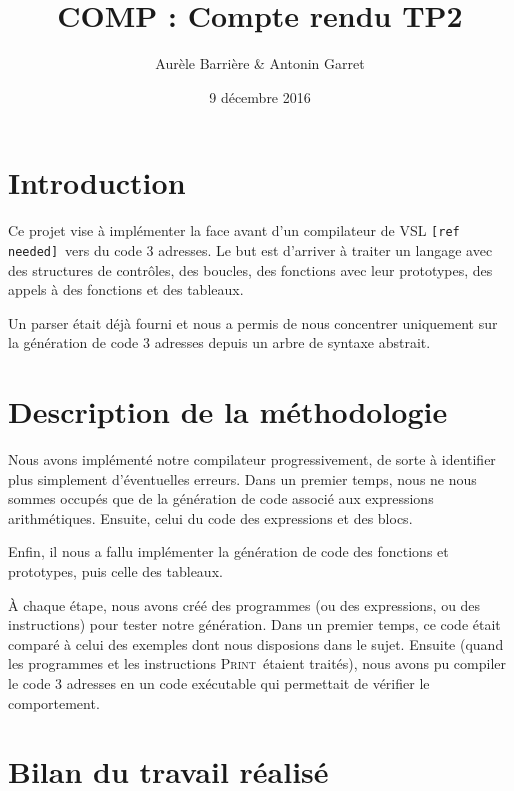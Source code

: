 \documentclass[french]{article}
\title{COMP : Compte rendu TP2}
\author{Aurèle Barrière \& Antonin Garret}
\date{9 décembre 2016}
\begin{document}
\maketitle

\def\refneeded{\texttt{[ref needed]}}
\def\iprint{\textsc{Print}}
\def\iread{\textsc{Read}}
\def\return{\textsc{Return}}

\section{Introduction}
Ce projet vise à implémenter la face avant d'un compilateur de VSL \refneeded\ vers du code 3 adresses.
Le but est d'arriver à traiter un langage avec des structures de contrôles, des boucles, des fonctions avec leur prototypes, des appels à des fonctions et des tableaux.

Un parser était déjà fourni et nous a permis de nous concentrer uniquement sur la génération de code 3 adresses depuis un arbre de syntaxe abstrait.


\section{Description de la méthodologie}
Nous avons implémenté notre compilateur progressivement, de sorte à identifier plus simplement d'éventuelles erreurs. Dans un premier temps, nous ne nous sommes occupés que de la génération de code associé aux expressions arithmétiques. Ensuite, celui du code des expressions et des blocs.

Enfin, il nous a fallu implémenter la génération de code des fonctions et prototypes, puis celle des tableaux.

À chaque étape, nous avons créé des programmes (ou des expressions, ou des instructions) pour tester notre génération. Dans un premier temps, ce code était comparé à celui des exemples dont nous disposions dans le sujet. Ensuite (quand les programmes et les instructions \iprint\ étaient traités), nous avons pu compiler le code 3 adresses en un code exécutable qui permettait de vérifier le comportement.


\section{Bilan du travail réalisé}
\end{document}
